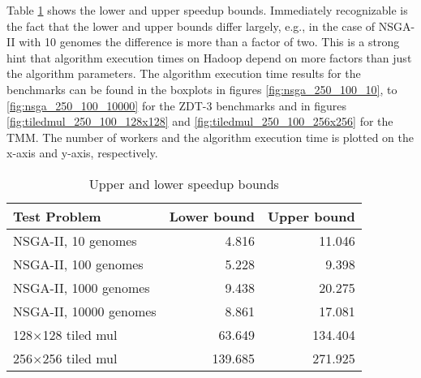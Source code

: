 Table \ref{table:speedup_bounds} shows the lower and upper speedup bounds. Immediately recognizable is the fact that the lower and upper bounds differ largely, e.g., in the case of NSGA-II with 10 genomes the difference is more than a factor of two. This is a strong hint that algorithm execution times on Hadoop depend on more factors than just the algorithm parameters. The algorithm execution time results for the benchmarks can be found in the boxplots in figures \ref{fig:nsga_250_100_10}, to \ref{fig:nsga_250_100_10000} for the ZDT-3 benchmarks and in figures \ref{fig:tiledmul_250_100_128x128} and \ref{fig:tiledmul_250_100_256x256} for the TMM. The number of workers and the algorithm execution time is plotted on the x-axis and y-axis, respectively.

\begin{table}
  \centering
  \caption{Upper and lower speedup bounds}
  \begin{tabular}{lrr}\toprule[2pt]
    Test Problem & Lower bound & Upper bound \\ \midrule
    NSGA-II, 10 genomes & 4.816 & 11.046 \\ %
    NSGA-II, 100 genomes & 5.228 & 9.398 \\ %
    NSGA-II, 1000 genomes & 9.438 & 20.275 \\ %
    NSGA-II, 10000 genomes & 8.861 & 17.081 \\ %
    128$\times$128 tiled mul & 63.649 & 134.404 \\ %
    256$\times$256 tiled mul & 139.685 & 271.925 \\ \bottomrule[2pt] %
  \end{tabular}
  \label{table:speedup_bounds}
\end{table}

